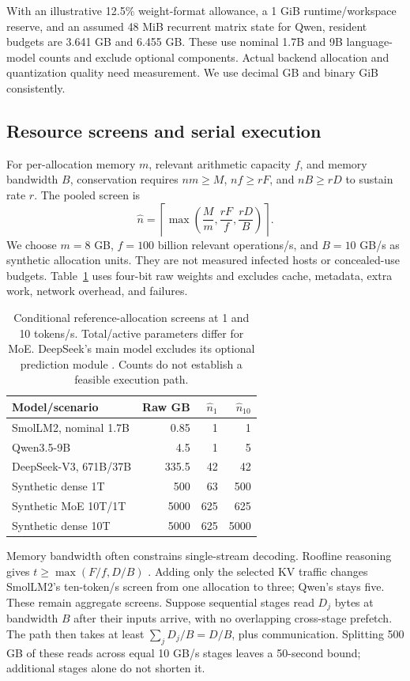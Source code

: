 \documentclass[10pt,twocolumn]{article}
\begin{document}
With an illustrative 12.5\% weight-format allowance, a 1 GiB runtime/workspace reserve, and an assumed 48 MiB recurrent matrix state for Qwen, resident budgets are 3.641 GB and 6.455 GB. These use nominal 1.7B and 9B language-model counts and exclude optional components. Actual backend allocation and quantization quality need measurement. We use decimal GB and binary GiB consistently.

\subsection{Resource screens and serial execution}
For per-allocation memory $m$, relevant arithmetic capacity $f$, and memory bandwidth $B$, conservation requires $nm\ge M$, $nf\ge rF$, and $nB\ge rD$ to sustain rate $r$. The pooled screen is
\begin{equation}\label{eq:screen}
\widehat n=\left\lceil\max\left(\frac M m,\frac{rF}f,\frac{rD}B\right)\right\rceil.
\end{equation}
We choose $m=8$ GB, $f=100$ billion relevant operations/s, and $B=10$ GB/s as synthetic allocation units. They are not measured infected hosts or concealed-use budgets. Table~\ref{tab:counts} uses four-bit raw weights and excludes cache, metadata, extra work, network overhead, and failures.

\begin{table}[t]
\centering\small
\begin{tabular}{lrrr}
\toprule Model/scenario & Raw GB & $\widehat n_1$ & $\widehat n_{10}$\\\midrule
SmolLM2, nominal 1.7B & 0.85 & 1 & 1\\
Qwen3.5-9B & 4.5 & 1 & 5\\
DeepSeek-V3, 671B/37B & 335.5 & 42 & 42\\
Synthetic dense 1T & 500 & 63 & 500\\
Synthetic MoE 10T/1T & 5000 & 625 & 625\\
Synthetic dense 10T & 5000 & 625 & 5000\\\bottomrule
\end{tabular}
\caption{Conditional reference-allocation screens at 1 and 10 tokens/s. Total/active parameters differ for MoE. DeepSeek's main model excludes its optional prediction module \citep{deepseek}. Counts do not establish a feasible execution path.}\label{tab:counts}
\end{table}

Memory bandwidth often constrains single-stream decoding. Roofline reasoning gives $t\ge\max(F/f,D/B)$ \citep{roofline}. Adding only the selected KV traffic changes SmolLM2's ten-token/s screen from one allocation to three; Qwen's stays five. These remain aggregate screens. Suppose sequential stages read $D_j$ bytes at bandwidth $B$ after their inputs arrive, with no overlapping cross-stage prefetch. The path then takes at least $\sum_jD_j/B=D/B$, plus communication. Splitting 500 GB of these reads across equal 10 GB/s stages leaves a 50-second bound; additional stages alone do not shorten it.
\end{document}

